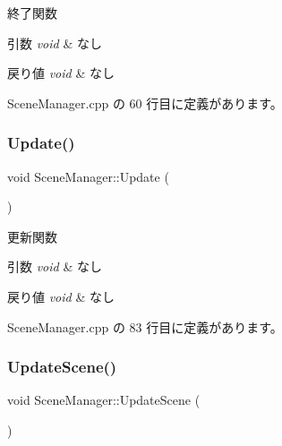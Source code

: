 終了関数 


\begin{DoxyParams}{引数}
{\em void} & なし \\
\hline
\end{DoxyParams}

\begin{DoxyRetVals}{戻り値}
{\em void} & なし \\
\hline
\end{DoxyRetVals}


 Scene\+Manager.\+cpp の 60 行目に定義があります。

\mbox{\label{class_scene_manager_a63dcf65832d6a2c190bf496d9a3b00a3}} 
\subsubsection{\texorpdfstring{Update()}{Update()}}
{\footnotesize\ttfamily void Scene\+Manager\+::\+Update (\begin{DoxyParamCaption}{ }\end{DoxyParamCaption})}



更新関数 


\begin{DoxyParams}{引数}
{\em void} & なし \\
\hline
\end{DoxyParams}

\begin{DoxyRetVals}{戻り値}
{\em void} & なし \\
\hline
\end{DoxyRetVals}


 Scene\+Manager.\+cpp の 83 行目に定義があります。

\mbox{\label{class_scene_manager_a493bc0d65558ce004f6f248a185ba956}} 
\subsubsection{\texorpdfstring{Update\+Scene()}{UpdateScene()}}
{\footnotesize\ttfamily void Scene\+Manager\+::\+Update\+Scene (\begin{DoxyParamCaption}{ }\end{DoxyParamCaption})}



